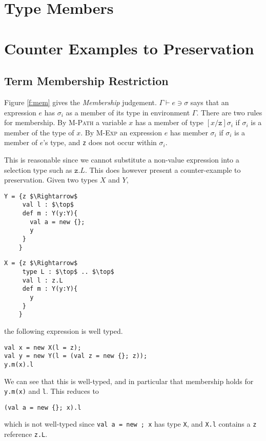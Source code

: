 \documentclass{llncs}
\begin{document}
\section{Type Members}

\section{Counter Examples to Preservation}
	\label{s:examples}

\subsection{Term Membership Restriction}
	\label{s:term_mem}
Figure \ref{f:mem} gives the \emph{Membership} judgement. 
$\Gamma \vdash e \ni \sigma$ says that an expression $e$ 
has $\sigma_i$ as a member of its type in environment $\Gamma$. 
There are two rules for membership. By \textsc{M-Path} a 
variable $x$ has a member of type $[x/\texttt{z}]\sigma_i$ 
if $\sigma_i$ is a member of the type of $x$. By \textsc{M-Exp}
an expression $e$ has member $\sigma_i$ if $\sigma_i$ is 
a member of $e$'s type, and \texttt{z} does not occur 
within $\sigma_i$.

This is reasonable since we cannot substitute a non-value 
expression into a selection type such as $\texttt{z}.L$. 
This does however present a counter-example to preservation. 
Given two types $X$ and $Y$,

\begin{lstlisting}[mathescape, style=custom_lang]
Y = {z $\Rightarrow$
     val l : $\top$
     def m : Y(y:Y){
       val a = new {};
       y
     }
    }
\end{lstlisting}
\begin{lstlisting}[mathescape, style=custom_lang]
X = {z $\Rightarrow$
     type L : $\top$ .. $\top$
     val l : z.L
     def m : Y(y:Y){
       y
     }
    }
\end{lstlisting}

the following expression is well typed.
\begin{lstlisting}[mathescape, style=custom_lang]
val x = new X(l = z);
val y = new Y(l = (val z = new {}; z));
y.m(x).l
\end{lstlisting}
We can see that this is well-typed, and in particular that membership 
holds for \texttt{y.m(x)} and \texttt{l}. This reduces to 
\begin{lstlisting}[mathescape, style=custom_lang]
(val a = new {}; x).l
\end{lstlisting}
which is not well-typed since \texttt{val a = new {}; x} has type 
\texttt{X}, and \texttt{X.l} contains a \texttt{z} reference 
\texttt{z.L}.
\end{document}
